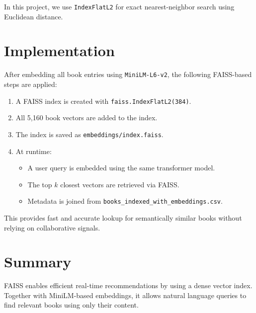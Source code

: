 In this project, we use \texttt{IndexFlatL2} for exact nearest-neighbor search using Euclidean distance.

\section{Implementation}
\label{sec:similarity-implementation}

After embedding all book entries using \texttt{MiniLM-L6-v2}, the following FAISS-based steps are applied:

\begin{enumerate}
    \item A FAISS index is created with \texttt{faiss.IndexFlatL2(384)}.
    \item All 5,160 book vectors are added to the index.
    \item The index is saved as \texttt{embeddings/index.faiss}.
    \item At runtime:
    \begin{itemize}
        \item A user query is embedded using the same transformer model.
        \item The top $k$ closest vectors are retrieved via FAISS.
        \item Metadata is joined from \texttt{books\_indexed\_with\_embeddings.csv}.
    \end{itemize}
\end{enumerate}

This provides fast and accurate lookup for semantically similar books without relying on collaborative signals.

\section{Summary}
\label{sec:similarity-summary}

FAISS enables efficient real-time recommendations by using a dense vector index. 
Together with MiniLM-based embeddings, it allows natural language queries to find relevant books using only their content.
